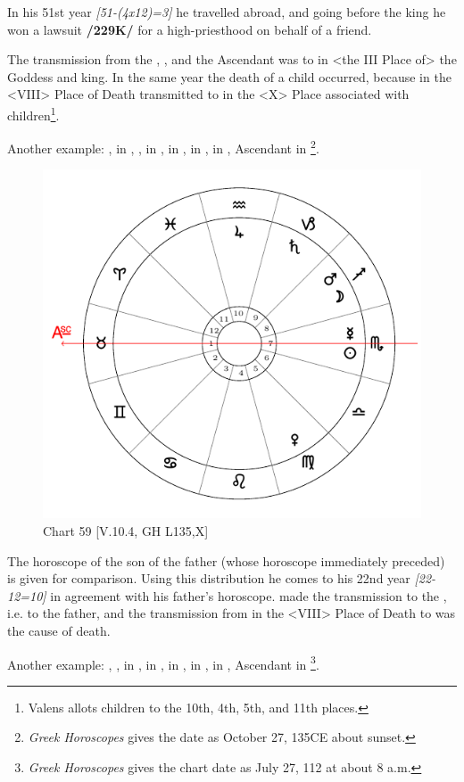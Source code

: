 \noindent In his 51st year \textsl{[51-(4x12)=3]} he travelled abroad, and going before the king he won a lawsuit \textbf{/229K/} for a high-priesthood on behalf of a friend. 

The transmission from the \Moon, \Venus, and the Ascendant was to \Mercury\xspace in <the III Place of> the Goddess and king. In the same year the death of a child occurred, because \Mars\xspace in the <VIII> Place of Death transmitted to \Saturn\xspace in the <X> Place associated with children\footnote{Valens allots children to the 10th, 4th, 5th, and 11th places.}.

\newpage

\noindent Another example: \Sun, \Mercury\xspace in \Scorpio, \Moon, \Mars\xspace in \Sagittarius, \Saturn\xspace in \Capricorn, \Jupiter\xspace in \Aquarius, \Venus\xspace in \Virgo, Ascendant in \Taurus\footnote{\textit{Greek Horoscopes} gives the date as October 27, 135CE about sunset.}. 

\begin{figure}
\centering
\vspace{-10pt}
\includegraphics[width=.68\textwidth]{charts/5_10_04}
\caption{Chart 59 [V.10.4, GH L135,X]}
\label{fig:chart59}
\end{figure}


The horoscope of the son of the father (whose horoscope immediately preceded) is given for comparison. Using this distribution he comes to his 22nd year \textsl{[22-12=10]} in agreement with his father’s horoscope. \Jupiter\xspace made the transmission to the \Sun, i.e. to the father, and the transmission from \Mars\xspace in the <VIII> Place of Death to \Venus\xspace was the cause of death.

\newpage
Another example: \Sun, \Mars, \Venus\xspace in \Leo, \Moon\xspace in \Aquarius, \Saturn\xspace in \Aries, \Jupiter\xspace in \Pisces,
\Mercury\xspace in \Cancer, Ascendant in \Virgo\footnote{\textit{Greek Horoscopes} gives the chart date as July 27, 112 at about 8 a.m.}. 


